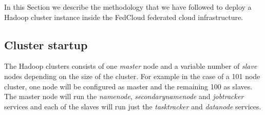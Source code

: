In this Section we describe the methodology that we have followed to deploy a Hadoop cluster instance inside the FedCloud federated cloud infrastructure. 

\subsection{Cluster startup}
\label{ssect-cluster}

The Hadoop clusters consists of one \emph{master} node and a variable number of \emph{slave} nodes depending on the size of the cluster. For example in the case of a 101 node cluster, one node will be configured as master and the remaining 100 as slaves. The master node will run the \emph{namenode}, \emph{secondarynamenode} and \emph{jobtracker} services and each of the slaves will run just the \emph{tasktracker} and \emph{datanode} services.




